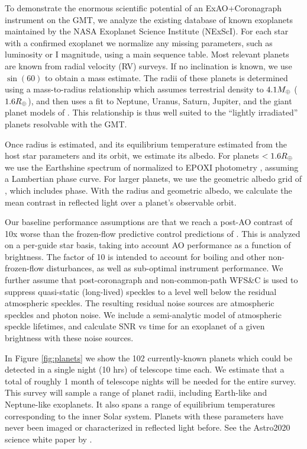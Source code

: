 \documentclass[12pt,preprint]{aastex}
\begin{document}
To demonstrate the enormous scientific potential of an ExAO+Coronagraph instrument on the GMT, we analyze the existing database of known exoplanets maintained by the NASA Exoplanet Science Institute (NExScI).  For each star with a confirmed exoplanet we normalize any missing parameters, such as luminosity or I magnitude, using a main sequence table.  Most relevant planets are known from radial velocity (RV) surveys.  If no inclination is known, we use $\sin(60)$ to obtain a mass estimate.  The radii of these planets is determined using a mass-to-radius relationship which assumes terrestrial density to $4.1 M_\oplus$ ($1.6 R_\oplus$), and then uses a fit to Neptune, Uranus, Saturn, Jupiter, and the giant planet models of \citet{2007ApJ...659.1661F}.  This relationship is thus well suited to the “lightly irradiated” planets resolvable with the GMT.

Once radius is estimated, and its equilibrium temperature estimated from the host star parameters and its orbit, we estimate its albedo.  For planets $< 1.6 R_\oplus$ we use the Earthshine spectrum of \citet{2006ApJ...644..551T} normalized to EPOXI photometry \citep{2013ApJ...765L..17C}, assuming a Lambertian phase curve. For larger planets, we use the geometric albedo grid of \citet{2010ApJ...724..189C}, which includes phase.  With the radius and geometric albedo, we calculate the mean contrast in reflected light over a planet’s observable orbit.	

Our baseline performance assumptions are that we reach a post-AO contrast of 10x worse than the frozen-flow predictive control predictions of \citet{2018JATIS...4a9001M}.  This is analyzed on a per-guide star basis, taking into account AO performance as a function of brightness.  The factor of 10 is intended to account for boiling and other non-frozen-flow disturbances, as well as sub-optimal instrument performance.  We further assume that post-coronagraph and non-common-path WFS\&C is used to suppress quasi-static (long-lived) speckles to a level well below the residual atmospheric speckles.  The resulting residual noise sources are atmospheric speckles and photon noise.  We include a semi-analytic model of atmospheric speckle lifetimes, and calculate SNR vs time for an exoplanet of a given brightness with these noise sources.

In Figure \ref{fig:planets} we show the 102 currently-known planets which could be detected in a single night (10 hrs) of telescope time each.  We estimate that a total of roughly 1 month of telescope nights will be needed for the entire survey.  This survey will sample a range of planet radii, including Earth-like and Neptune-like exoplanets.  It also spans a range of equilibrium temperatures corresponding to the inner Solar system.  Planets with these parameters have never been imaged or characterized in reflected light before.  See the Astro2020 science white paper by \citet{2019BAAS...51c.345M}.
\end{document}
